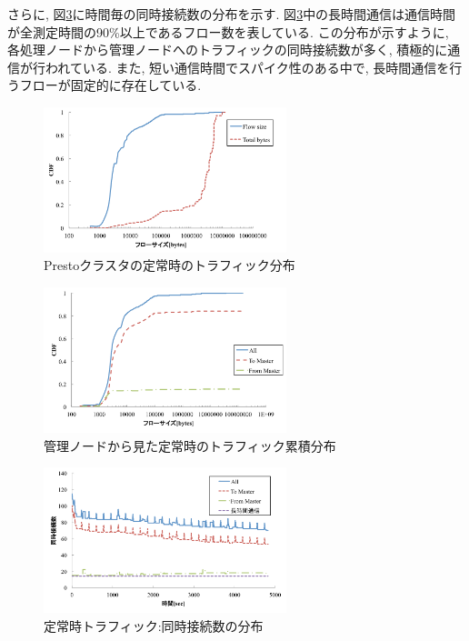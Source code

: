 さらに, 図\ref{fig:constant_conc}に時間毎の同時接続数の分布を示す.
図\ref{fig:constant_conc}中の長時間通信は通信時間が全測定時間の90\%以上であるフロー数を表している.
この分布が示すように, 各処理ノードから管理ノードへのトラフィックの同時接続数が多く, 積極的に通信が行われている.
また, 短い通信時間でスパイク性のある中で, 長時間通信を行うフローが固定的に存在している.
\begin{figure}[t]
    \begin{center}
    \includegraphics[autoebb, width=200pt]{./img/constant.pdf}
    \caption{Prestoクラスタの定常時のトラフィック分布}
    \label{fig:constant}
    \end{center}
\end{figure}

\begin{figure}[t]
    \begin{center}
    \includegraphics[autoebb, width=200pt]{./img/constant_cdf.pdf}
    \caption{管理ノードから見た定常時のトラフィック累積分布}
    \label{fig:constant_cdf}
    \end{center}
\end{figure}

\begin{figure}[t]
    \begin{center}
    \includegraphics[autoebb, width=200pt]{./img/constant_conc.pdf}
    \caption{定常時トラフィック:同時接続数の分布}
    \label{fig:constant_conc}
    \end{center}
\end{figure}

